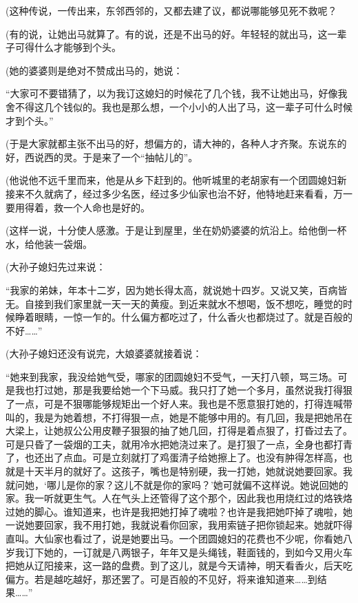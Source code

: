 \par (这种传说，一传出来，东邻西邻的，又都去建了议，都说哪能够见死不救呢？
\par (有的说，让她出马就算了。有的说，还是不出马的好。年轻轻的就出马，这一辈子可得什么才能够到个头。
\par (她的婆婆则是绝对不赞成出马的，她说：
\par “大家可不要错猜了，以为我订这媳妇的时候花了几个钱，我不让她出马，好像我舍不得这几个钱似的。我也是那么想，一个小小的人出了马，这一辈子可什么时候才到个头。”
\par (于是大家就都主张不出马的好，想偏方的，请大神的，各种人才齐聚。东说东的好，西说西的灵。于是来了一个“抽帖儿的”。
\par (他说他不远千里而来，他是从乡下赶到的。他听城里的老胡家有一个团圆媳妇新接来不久就病了，经过多少名医，经过多少仙家也治不好，他特地赶来看看，万一要用得着，救一个人命也是好的。
\par (这样一说，十分使人感激。于是让到屋里，坐在奶奶婆婆的炕沿上。给他倒一杯水，给他装一袋烟。
\par (大孙子媳妇先过来说：
\par “我家的弟妹，年本十二岁，因为她长得太高，就说她十四岁。又说又笑，百病皆无。自接到我们家里就一天一天的黄瘦。到近来就水不想喝，饭不想吃，睡觉的时候睁着眼睛，一惊一乍的。什么偏方都吃过了，什么香火也都烧过了。就是百般的不好……”
\par (大孙子媳妇还没有说完，大娘婆婆就接着说：
\par “她来到我家，我没给她气受，哪家的团圆媳妇不受气，一天打八顿，骂三场。可是我也打过她，那是我要给她一个下马威。我只打了她一个多月，虽然说我打得狠了一点，可是不狠哪能够规矩出一个好人来。我也是不愿意狠打她的，打得连喊带叫的，我是为她着想，不打得狠一点，她是不能够中用的。有几回，我是把她吊在大梁上，让她叔公公用皮鞭子狠狠的抽了她几回，打得是着点狠了，打昏过去了。可是只昏了一袋烟的工夫，就用冷水把她浇过来了。是打狠了一点，全身也都打青了，也还出了点血。可是立刻就打了鸡蛋清子给她擦上了。也没有肿得怎样高，也就是十天半月的就好了。这孩子，嘴也是特别硬，我一打她，她就说她要回家。我就问她，‘哪儿是你的家？这儿不就是你的家吗？’她可就偏不这样说。她说回她的家。我一听就更生气。人在气头上还管得了这个那个，因此我也用烧红过的烙铁烙过她的脚心。谁知道来，也许是我把她打掉了魂啦？也许是我把她吓掉了魂啦，她一说她要回家，我不用打她，我就说看你回家，我用索链子把你锁起来。她就吓得直叫。大仙家也看过了，说是她要出马。一个团圆媳妇的花费也不少呢，你看她八岁我订下她的，一订就是八两银子，年年又是头绳钱，鞋面钱的，到如今又用火车把她从辽阳接来，这一路的盘费。到了这儿，就是今天请神，明天看香火，后天吃偏方。若是越吃越好，那还罢了。可是百般的不见好，将来谁知道来……到结果……”

